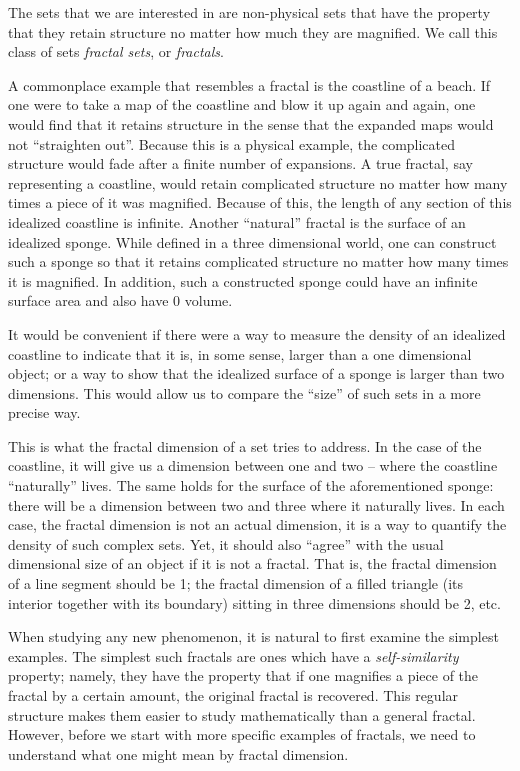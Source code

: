 The sets that we are interested in are non-physical sets that
have the property that they retain structure no matter how much 
they are magnified. We call this class of sets
{\it fractal sets}, or
{\it fractals}. 

A commonplace example that resembles a fractal is the coastline of
a beach. If one were to take a map of the coastline and blow it up
again and again, one would find that it retains structure in the
sense that the expanded maps would not ``straighten out''.
Because this is a physical example, the complicated structure would fade
after a finite number of expansions. A true fractal, say representing a 
coastline, would retain complicated
structure no matter how many times a piece of it was magnified.
Because of this, the length of any section of this idealized coastline is
infinite. Another ``natural'' fractal is the surface of an idealized sponge.
While defined in a three dimensional world, one can construct such a sponge so that
it retains complicated structure no matter how many times it is magnified.
In addition, such a constructed sponge could have an infinite surface area and 
also have 0 volume. 

It would be convenient if there were a way to
measure the density of an idealized coastline to
indicate that it is, in some sense, larger than a one dimensional
object; or a way to show that the idealized surface of a sponge is larger than
two dimensions. This would allow us to compare the ``size'' of such sets
in a more precise way.

This is what the fractal dimension of a set tries to address. 
In the case of the coastline, it will give us a dimension between one and two
-- where the coastline ``naturally'' lives. The same holds for the surface of
the aforementioned sponge:
there will be a dimension between two and three where it naturally lives. In
each case, the fractal dimension is not an actual dimension, 
it is a way to quantify the density of such complex sets.
Yet, it should also ``agree'' with the usual dimensional size of an object 
if it is not a fractal. That is, the fractal dimension of a line segment should 
be 1; the fractal dimension of a filled triangle (its interior together with
its boundary) sitting in three dimensions should be 2, etc.

When studying any new phenomenon, it is natural to first examine the
simplest examples. The simplest such fractals are ones which have a
{\it self-similarity} property; namely, they have the property that if
one magnifies a piece of the fractal by a certain amount, the original
fractal is recovered. This regular structure makes them easier to
study mathematically than a general fractal. However, before we start
with more specific examples of fractals, we need to understand what
one might mean by fractal dimension.


